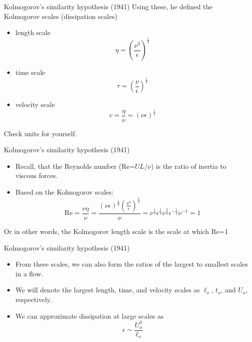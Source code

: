 \begin{frame}{Kolmogorov's similarity hypothesis (1941)}
	Using these, he defined the Kolmogorov scales (dissipation scales)
	\begin{itemize}
		\item length scale $$\eta = \left(\frac{\nu^3}{\epsilon}\right)^{\frac{1}{4}}$$
		\item time scale $$\tau = \left(\frac{\nu}{\epsilon}\right)^{\frac{1}{2}}$$
		\item velocity scale $$v = \frac{\eta}{\nu} = (\nu \epsilon)^{\frac{1}{4}}$$
	\end{itemize}
	Check units for yourself.
\end{frame}


\begin{frame}{Kolmogorov's similarity hypothesis (1941)}
\begin{itemize}
	\item Recall, that the Reynolds number (Re=$UL/\nu$) is the ratio of inertia to viscous forces.
	\item Based on the Kolmogorov scales: $$\text{Re} = \frac{v \eta}{\nu} = \frac{ (\nu \epsilon)^{\frac{1}{4}} \left(\frac{\nu^3}{\epsilon}\right)^{\frac{1}{4}}}{\nu} = \nu^{\frac{1}{4}} \epsilon^{\frac{1}{4}} \nu^{\frac{3}{4} }\epsilon^{-\frac{1}{4}} \nu^{-1} = 1$$
\end{itemize}
Or in other words, the Kolmogorov length scale is the scale at which Re=1
\end{frame}


\begin{frame}{Kolmogorov's similarity hypothesis (1941)}
\begin{itemize}
	\item From these scales, we can also form the ratios of the largest to smallest scales in a flow. 
	\item We will denote the largest length, time, and velocity scales as $\ell_o$, $t_o$, and $U_o$, respectively.
	\item We can approximate dissipation at large scales as $$\epsilon \sim \frac{U_o^3}{\ell_o}$$
\end{itemize}
\end{frame}


